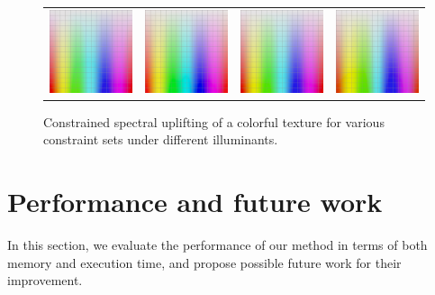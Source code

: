 \begin{figure}[ht]
{\begin{tabular}{cccc}
			\includegraphics[width=.22\linewidth]{img/gradient_complete_pantoneD75.jpg}
			&
			\includegraphics[width=.22\linewidth]{img/gradient_complete_noneFL9.jpg}
			& 
			\includegraphics[width=.22\linewidth]{img/gradient_complete_ralFL7.jpg}
			& 
			\includegraphics[width=.22\linewidth]{img/gradient_complete_mccSGFL3.jpg}\\
		\end{tabular}
	}
	\caption{Constrained spectral uplifting of a colorful texture for various constraint sets under different illuminants.}
	\label{fig:uplift_colourful_texture}
	\vspace{-1em}
\end{figure}


\section{Performance and future work}

In this section, we evaluate the performance of our method in terms of both memory and execution time, and propose possible future work for their improvement.

